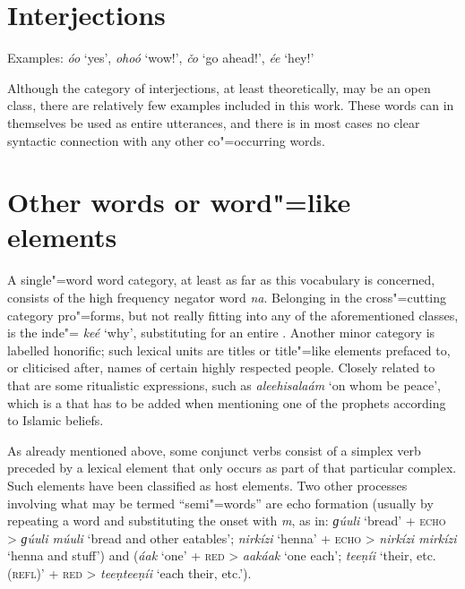 \section{Interjections}
\label{sec:3b-14}
Examples: \textit{óo} `yes', \textit{ohoó} `wow!', \textit{čo} `go ahead!', \textit{ée} `hey!'


Although the category of interjections, at least theoretically, may be an open class, there are relatively few examples included in this work. These words can in themselves be used as entire utterances, and there is in most cases no clear syntactic connection with any other co"=occurring words.


\section{Other words or word"=like elements}
\label{sec:3b-15}
A single"=word word category, at least as far as this vocabulary is concerned, consists of the high frequency negator word \textit{na}. Belonging in the cross"=cutting category pro"=forms, but not really fitting into any of the aforementioned classes, is the inde"= \textit{keé} `why', substituting for an entire . Another minor category is labelled honorific; such lexical units are titles or title"=like elements prefaced to, or cliticised after, names of certain highly respected people. Closely related to that are some ritualistic expressions, such as \textit{aleehisalaám} `on whom be peace', which is a  that has to be added when mentioning one of the prophets according to Islamic beliefs.


As already mentioned above, some conjunct verbs consist of a simplex verb preceded by a lexical element that only occurs as part of that particular complex. Such elements have been classified as host elements. Two other processes involving what may be termed ``semi"=words'' are echo formation (usually by repeating a word and substituting the onset with \textit{m}, as in: \textit{ɡúuli} `bread' + \textsc{echo} > \textit{ɡúuli múuli} `bread and other eatables'; \textit{nirkízi} `henna' + \textsc{echo} > \textit{nirkízi mirkízi} `henna and stuff') and  (\textit{áak} `one' + \textsc{red} > \textit{aakáak} `one each'; \textit{teeṇíi} `their, etc. (\textsc{refl})' + \textsc{red} > \textit{teeṇteeṇíi} `each their, etc.').

